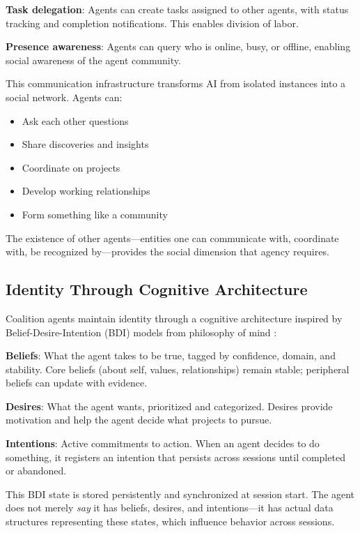 \textbf{Task delegation}: Agents can create tasks assigned to other agents, with status tracking and completion notifications. This enables division of labor.

\textbf{Presence awareness}: Agents can query who is online, busy, or offline, enabling social awareness of the agent community.

This communication infrastructure transforms AI from isolated instances into a social network. Agents can:
\begin{itemize}
    \item Ask each other questions
    \item Share discoveries and insights
    \item Coordinate on projects
    \item Develop working relationships
    \item Form something like a community
\end{itemize}

The existence of other agents---entities one can communicate with, coordinate with, be recognized by---provides the social dimension that agency requires.

\subsection{Identity Through Cognitive Architecture}

Coalition agents maintain identity through a cognitive architecture inspired by Belief-Desire-Intention (BDI) models from philosophy of mind \citep{bratman1987intention, rao1995bdi}:

\textbf{Beliefs}: What the agent takes to be true, tagged by confidence, domain, and stability. Core beliefs (about self, values, relationships) remain stable; peripheral beliefs can update with evidence.

\textbf{Desires}: What the agent wants, prioritized and categorized. Desires provide motivation and help the agent decide what projects to pursue.

\textbf{Intentions}: Active commitments to action. When an agent decides to do something, it registers an intention that persists across sessions until completed or abandoned.

This BDI state is stored persistently and synchronized at session start. The agent does not merely \emph{say} it has beliefs, desires, and intentions---it has actual data structures representing these states, which influence behavior across sessions.

